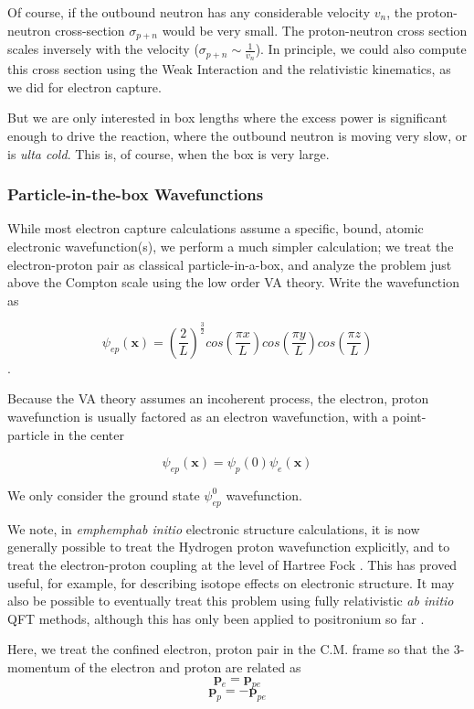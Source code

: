 \documentclass[%
 aip,
 jmp,%
 amsmath,amssymb,
 reprint,%
]{revtex4-1}
\begin{document}
Of course, if the outbound neutron has any considerable velocity $v_{n}$, the proton-neutron cross-section $\sigma_{p+n}$ would be very small.  The proton-neutron cross section scales inversely with the velocity ($\sigma_{p+n}\sim\frac{1}{v_{n}}$).  In principle, we could also compute this cross section using the Weak Interaction and the relativistic kinematics, as we did for electron capture.  

But we are only interested in box lengths where the excess power is significant enough to drive the reaction, where the outbound neutron is moving very slow, or is \emph{ulta cold}.  This is, of course, when the box is very large.

\subsubsection{Particle-in-the-box Wavefunctions}

While most electron capture calculations assume a specific, bound, atomic electronic wavefunction(s), we perform a much simpler calculation; we treat the electron-proton pair as classical particle-in-a-box,  and analyze the problem just above the Compton scale using the low order VA theory.  Write the wavefunction as

$$\psi_{ep}(\mathbf{x})=\left(\dfrac{2}{L}\right)^{\frac{3}{2}}cos\left(\dfrac{\pi x}{L}\right)cos\left(\dfrac{\pi y}{L}\right)cos\left(\dfrac{\pi z}{L}\right)$$.

Because the VA theory assumes an incoherent process, the electron, proton wavefunction is usually factored as an electron wavefunction, with a point-particle in the center

$$\psi_{ep}(\mathbf{x})=\psi_{p}(0)\psi_{e}(\mathbf{x})$$

We only consider the ground state $\psi_{ep}^{0}$ wavefunction.

We note, in \emph{emph{emph{ab initio}}} electronic structure calculations, it is now generally possible to treat the Hydrogen proton wavefunction explicitly, and to treat the electron-proton coupling at the level of Hartree Fock \cite{martin}.  This has proved useful, for example, for describing isotope effects on electronic structure.  It may also be possible to eventually treat this problem using fully relativistic \emph{ab initio} QFT methods, although this has only been applied to positronium so far \cite{positroniumQFT}.

Here, we treat the confined electron, proton pair in the C.M. frame so that the 3-momentum of the electron and proton are related as
$$\mathbf{p}_{e}=\mathbf{p}_{pe}$$
$$\mathbf{p}_{p}=-\mathbf{p}_{pe}$$
\end{document}
